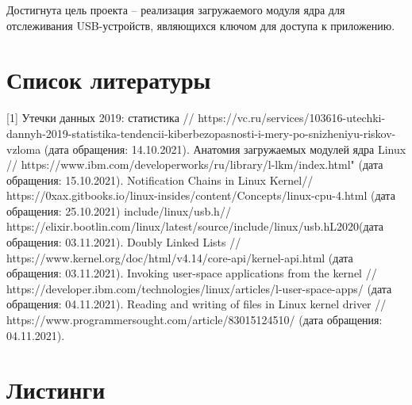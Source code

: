 \documentclass[a4paper, 10pt]{article}
\begin{document}
	Достигнута цель проекта -- реализация загружаемого модуля ядра для отслеживания USB-устройств, являющихся ключом для доступа к приложению. 
\clearpage
\newpage

\section*{Список литературы}
[1] \hspace{2mm} Утечки данных 2019: статистика // https://vc.ru/services/103616-utechki-dannyh-2019-statistika-tendencii-kiberbezopasnosti-i-mery-po-snizheniyu-riskov-vzloma (дата обращения: 14.10.2021).\vspace{3mm}
\newline [2]\hspace{2mm} Анатомия загружаемых модулей ядра Linux // https://www.ibm.com/developerworks/ru/library/l-lkm/index.html" (дата обращения: 15.10.2021).\vspace{3mm}
\newline [3]\hspace{2mm} Notification Chains in Linux Kernel// https://0xax.gitbooks.io/linux-insides/content/Concepts/linux-cpu-4.html (дата обращения: 25.10.2021)\vspace{3mm} 
\newline [4]\hspace{2mm} include/linux/usb.h// https://elixir.bootlin.com/linux/latest/source/include/linux/usb.hL2020(дата обращения: 03.11.2021).\vspace{3mm}
\newline [5]\hspace{2mm} Doubly Linked Lists // https://www.kernel.org/doc/html/v4.14/core-api/kernel-api.html (дата обращения: 03.11.2021).\vspace{3mm}
\newline [6]\hspace{2mm} Invoking user-space applications from the kernel // https://developer.ibm.com/technologies/linux/articles/l-user-space-apps/ (дата обращения: 04.11.2021).\vspace{3mm}
\newline [7]\hspace{2mm} Reading and writing of files in Linux kernel driver // https://www.programmersought.com/article/83015124510/ (дата обращения: 04.11.2021).\vspace{3mm}

\clearpage
\newpage


\section*{Листинги}
\end{document}

